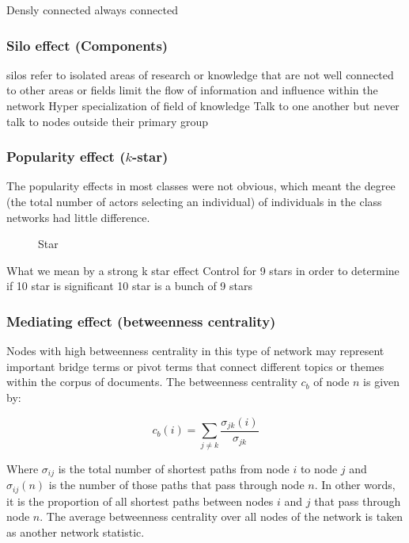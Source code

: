 Densly connected always connected

\subsubsection{Silo effect (Components)}

silos refer to isolated areas of research or knowledge that are not well connected to other areas or fields limit the flow of information and influence within the network
Hyper specialization of field of knowledge
Talk to one another but never talk to nodes outside their primary group

\subsubsection{Popularity effect ($k$-star)}

The popularity effects in most classes were not obvious, which meant the degree (the total number of actors selecting an individual) of individuals in the class networks had little difference.

\begin{figure}[H]
    \centering
    \caption{Star} \label{fig:k_star}
\end{figure}

What we mean by a strong k star effect
Control for 9 stars in order to determine if 10 star is significant
10 star is a bunch of 9 stars

\subsubsection{Mediating effect (betweenness centrality)}

Nodes with high betweenness centrality in this type of network may represent important bridge terms or pivot terms that connect different topics or themes within the corpus of documents. The betweenness centrality $c_b$ of node $n$ is given by:

$$
c_b(i) = \sum_{j \ne k} \frac{\sigma_{jk}(i)}{\sigma_{jk}}
$$

Where $\sigma_{ij}$ is the total number of shortest paths from node $i$ to node $j$ and $\sigma_{ij}(n)$ is the number of those paths that pass through node $n$. In other words, it is the proportion of all shortest paths between nodes $i$ and $j$ that pass through node $n$. The average betweenness centrality over all nodes of the network is taken as another network statistic. 

